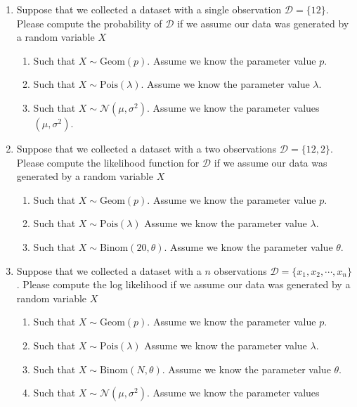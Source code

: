 \begin{enumerate}
    \item Suppose that we collected a dataset with a single observation $\mathcal{D} = \{ 12 \}$. Please compute the probability of $\mathcal{D}$ if we assume our data was generated by a random variable $X$
    \begin{enumerate}
        \item Such that $X \sim \text{Geom}(p)$. Assume we know the parameter value $p$. 
        \item Such that $X \sim \text{Pois}(\lambda)$. Assume we know the parameter value $\lambda$. 
        \item Such that $X \sim \mathcal{N}(\mu,\sigma^{2})$.
        Assume we know the parameter values $(\mu, \sigma^{2})$.
    \end{enumerate}
    
    \item Suppose that we collected a dataset with a two observations $\mathcal{D} = \{ 12, 2 \}$. Please compute the likelihood function for $\mathcal{D}$ if we assume our data was generated by a random variable $X$
        \begin{enumerate}
        \item Such that $X \sim \text{Geom}(p)$. Assume we know the parameter value $p$. 
        \item Such that $X \sim \text{Pois}(\lambda)$ Assume we know the parameter value $\lambda$. 
        \item Such that $X \sim \text{Binom}(20, \theta)$.
        Assume we know the parameter value $\theta$.
    \end{enumerate}
    
    \item Suppose that we collected a dataset with a $n$ observations $\mathcal{D} = \{ x_{1}, x_{2}, \cdots, x_{n} \}$. Please compute the log likelihood if we assume our data was generated by a random variable $X$
        \begin{enumerate}
        \item Such that $X \sim \text{Geom}(p)$. Assume we know the parameter value $p$. 
        \item Such that $X \sim \text{Pois}(\lambda)$ Assume we know the parameter value $\lambda$. 
        \item Such that $X \sim \text{Binom}(N, \theta)$.
        Assume we know the parameter value $\theta$.
        \item Such that $X \sim \mathcal{N}(\mu,\sigma^{2})$.
        Assume we know the parameter values
    \end{enumerate}
    

\end{enumerate}
